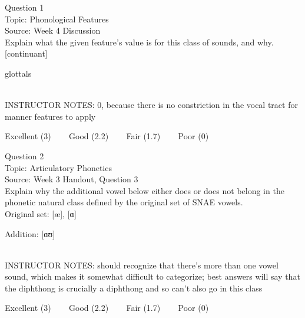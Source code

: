 \documentclass[12pt]{article}
\begin{document}
\begin{center}
\textbf{{\color{blue}{\HUGE START OF EXAM\\}}}

\textbf{{\color{blue}{\HUGE Student ID: 68935\\}}}

\textbf{{\color{blue}{\HUGE 4:00\\}}}

\end{center}
\newpage

{\large Question 1}\\

Topic: Phonological Features\\
Source: Week 4 Discussion\\

Explain what the given feature’s value is for this class of sounds, and why.\\

{[continuant]}

glottals


~\\
INSTRUCTOR NOTES: 0, because there is no constriction in the vocal tract for manner features to apply


\vfill
Excellent (3) ~~~ Good (2.2) ~~~ Fair (1.7) ~~~ Poor (0)
\newpage

{\large Question 2}\\

Topic: Articulatory Phonetics\\
Source: Week 3 Handout, Question 3\\

Explain why the additional vowel below either does or does not belong in the phonetic natural class defined by the original set of SNAE vowels.\\

Original set: {[æ]}, {[ɑ]}

Addition: {[ɑʊ]}


~\\
INSTRUCTOR NOTES: should recognize that there's more than one vowel sound, which makes it somewhat difficult to categorize; best answers will say that the diphthong is crucially a diphthong and so can't also go in this class


\vfill
Excellent (3) ~~~ Good (2.2) ~~~ Fair (1.7) ~~~ Poor (0)
\newpage

\begin{center}
\textbf{{\color{red}{\HUGE END OF EXAM}}}\\

\end{center}
\newpage
\end{document}

